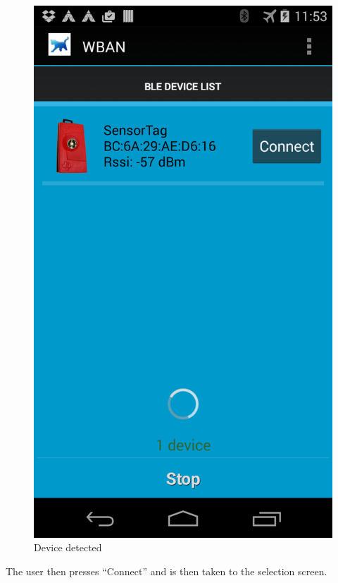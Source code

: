 \documentclass{article}
\begin{document}
\begin{figure}[!h]
  \centering
  \includegraphics[width=\WID]{pics/scan.png}
  \caption{Device detected}
  \label{fig:scan}
\end{figure}

The user then presses ``Connect'' and is then taken to the selection screen.
\end{document}
